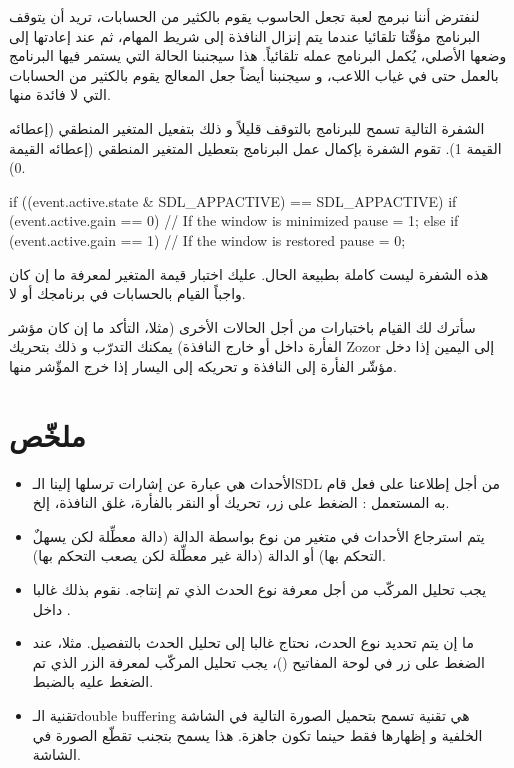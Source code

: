 لنفترض أننا نبرمج لعبة تجعل الحاسوب يقوم بالكثير من الحسابات، تريد أن يتوقف البرنامج مؤقّتا تلقائيا عندما يتم إنزال النافذة إلى شريط المهام، ثم عند إعادتها إلى وضعها الأصلي، يُكمل البرنامج عمله تلقائياً. هذا سيجنبنا الحالة التي يستمر فيها البرنامج بالعمل حتى في غياب اللاعب، و سيجنبنا أيضاً جعل المعالج يقوم بالكثير من الحسابات التي لا فائدة منها.

الشفرة التالية تسمح للبرنامج بالتوقف قليلاً و ذلك بتفعيل المتغير المنطقي 
(إعطائه القيمة 1). تقوم الشفرة بإكمال عمل البرنامج بتعطيل المتغير المنطقي (إعطائه القيمة 0).

\begin{Csource}
if ((event.active.state & SDL_APPACTIVE) == SDL_APPACTIVE)
{
	if (event.active.gain == 0) // If the window is minimized
		pause = 1;
	else if (event.active.gain == 1) // If the window is restored
		pause = 0;
}
\end{Csource}

\begin{information}
هذه الشفرة ليست كاملة بطبيعة الحال. عليك اختبار قيمة المتغير
لمعرفة ما إن كان واجباً القيام بالحسابات في برنامجك أو لا.
\end{information}

سأترك لك القيام باختبارات من أجل الحالات الأخرى (مثلا، التأكد ما إن كان مؤشر الفأرة داخل أو خارج النافذة) يمكنك التدرّب و ذلك بتحريك
\textenglish{Zozor}
إلى اليمين إذا دخل مؤشّر الفأرة إلى النافذة و تحريكه إلى اليسار إذا خرج المؤّشر منها.

\section*{ملخّص}

\begin{itemize}
	\item الأحداث هي عبارة عن إشارات ترسلها إلينا الـ\textenglish{SDL}
	من أجل إطلاعنا على فعل قام به المستعمل : الضغط على زر، تحريك أو النقر بالفأرة، غلق النافذة، إلخ.
	\item يتم استرجاع الأحداث في متغير من نوع
	بواسطة الدالة
	(دالة معطِّلة لكن يسهلٌ التحكم بها) أو الدالة 
	(دالة غير معطِّلة لكن يصعب التحكم بها).
	\item يجب تحليل المركّب
	من أجل معرفة نوع الحدث الذي تم إنتاجه. نقوم بذلك غالبا داخل 
	.
	\item ما إن يتم تحديد نوع الحدث، نحتاج غالبا إلى تحليل الحدث بالتفصيل. مثلا، عند الضغط على زر في لوحة المفاتيح
	()،
	يجب تحليل المركّب
	لمعرفة الزر الذي تم الضغط عليه بالضبط.
	\item تقنية الـ\textenglish{double buffering}
	هي تقنية تسمح بتحميل الصورة التالية في الشاشة الخلفية و إظهارها فقط حينما تكون جاهزة. هذا يسمح بتجنب تقطّع الصورة في الشاشة.
\end{itemize}
